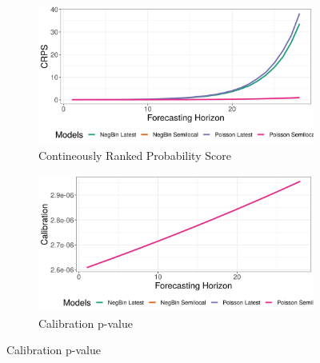 \begin{figure}[H]
\begin{subfigure}{0.5\textwidth}
  \centering
  \includegraphics[width=\linewidth]{../output/Mangurujipa_crps.png}  
  \caption{Contineously Ranked Probability Score}
  \label{Mangurujipa_scores_1}
\end{subfigure}
\begin{subfigure}{0.5\textwidth}
  \centering
  \includegraphics[width=\linewidth]{../output/Mangurujipa_calibration.png}  
  \caption{Calibration p-value}
  \label{Mangurujipa_scores_2}
\end{subfigure}


\end{figure}
